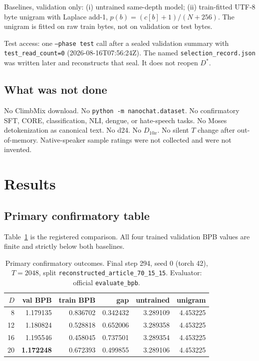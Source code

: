 \documentclass[11pt,a4paper]{article}
\begin{document}
Baselines, validation only: (i) untrained same-depth model; (ii) train-fitted UTF-8 byte unigram with Laplace add-1, $p(b)=(c[b]+1)/(N+256)$. The unigram is fitted on raw train bytes, not on validation or test bytes.

Test access: one \texttt{--phase test} call after a sealed validation summary with \texttt{test\_read\_count=0} (2026-08-16T07:56:24Z). The named \texttt{selection\_record.json} was written later and reconstructs that seal. It does not reopen $D^{\ast}$.

\subsection{What was not done}
No ClimbMix download. No \texttt{python -m nanochat.dataset}. No confirmatory SFT, CORE, classification, NLI, dengue, or hate-speech tasks. No Moses detokenization as canonical text. No d24. No $D_{10x}$. No silent $T$ change after out-of-memory. Native-speaker sample ratings were not collected and were not invented.

\section{Results}
\label{sec:results}

\subsection{Primary confirmatory table}
Table~\ref{tab:primary} is the registered comparison. All four trained validation BPB values are finite and strictly below both baselines.

\begin{table}[t]
\centering
\caption{Primary confirmatory outcomes. Final step 294, seed 0 (torch 42), $T=2048$, split \texttt{reconstructed\_article\_70\_15\_15}. Evaluator: official \texttt{evaluate\_bpb}.}
\label{tab:primary}
\begin{tabular}{rrrrrr}
\toprule
$D$ & val BPB & train BPB & gap & untrained & unigram \\
\midrule
8 & 1.179135 & 0.836702 & 0.342432 & 3.289109 & 4.453225 \\
12 & 1.180824 & 0.528818 & 0.652006 & 3.289358 & 4.453225 \\
16 & 1.195546 & 0.458045 & 0.737501 & 3.289354 & 4.453225 \\
20 & \textbf{1.172248} & 0.672393 & 0.499855 & 3.289106 & 4.453225 \\
\bottomrule
\end{tabular}
\end{table}
\end{document}
